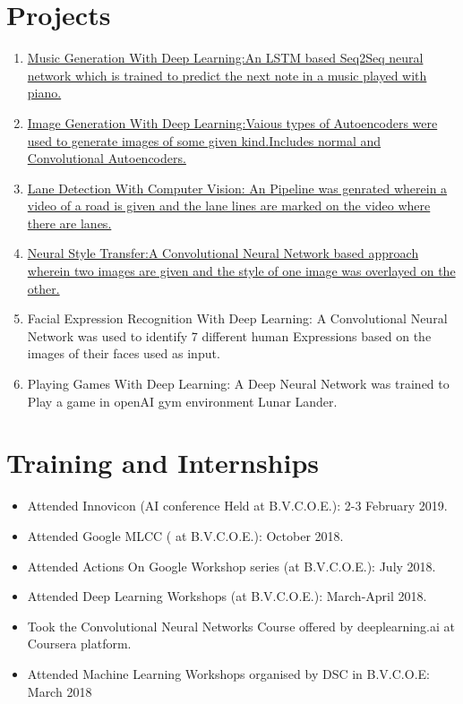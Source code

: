 \documentclass{my_cv}
\begin{document}
	\section{\colorbox{mycolor}{\textcolor{golde}{Projects}}}
	  \begin{enumerate}
	  	\item \href{https://github.com/anuj2110/lstm-music-gen}{Music Generation With Deep Learning:An LSTM based Seq2Seq neural network which is trained to predict the next note in a music played with piano.}
	  	
	  	\item \href{https://github.com/anuj2110/keras}{Image Generation With Deep Learning:Vaious types of Autoencoders were used to generate images of some given kind.Includes normal and Convolutional Autoencoders.}
	  	\item \href{https://github.com/anuj2110/LaneDetection}{ Lane Detection With Computer Vision:
	  		An Pipeline was genrated wherein a video of a road is given and the lane lines are marked on the video where there are lanes.}
	  	\item \href{https://github.com/anuj2110/neural-style-transfer}{Neural Style Transfer:A Convolutional Neural Network based approach wherein two images are given and the style of one image was overlayed on the other.}
	  	\item Facial Expression Recognition With Deep Learning:
	  	A Convolutional Neural Network was used to identify 7 different human Expressions based on the images of their faces used as input.
	  	\item Playing Games With Deep Learning: A Deep Neural Network was trained to Play a game in openAI gym environment Lunar Lander.
	  \end{enumerate}
	\section{\colorbox{mycolor}{\textcolor{golde}{Training and Internships}}}
		\begin{itemize}
			\item Attended Innovicon (AI conference Held at B.V.C.O.E.): 2-3 February 2019.
			\item Attended Google MLCC ( at B.V.C.O.E.): October 2018.
			\item Attended Actions On Google Workshop series (at B.V.C.O.E.): July 2018.
			\item Attended Deep Learning Workshops (at B.V.C.O.E.): March-April 2018.
			\item Took the Convolutional Neural Networks Course offered by deeplearning.ai at Coursera platform.
			\item Attended Machine Learning Workshops organised by DSC in B.V.C.O.E: March 2018
			 
		\end{itemize}
\end{document}
